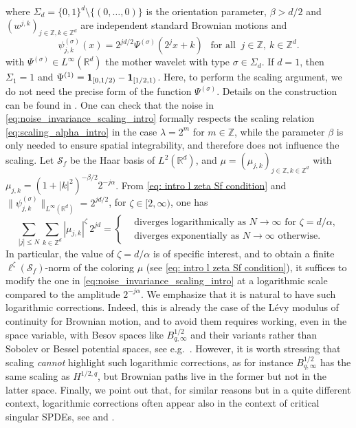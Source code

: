 \documentclass[reqno]{amsart}
\theoremstyle{plain}
\theoremstyle{remark}
\theoremstyle{plain}
\numberwithin{equation}{section}
\def\Z{{\mathbb Z}}
\def\R{{\mathbb R}}
\newcommand{\one}{{{\bf 1}}}
\newcommand{\1}{\one}
\newcommand{\Sf}{\mathcal{S}_{f}}
\begin{document}
where $\Sigma_d =\{0,1\}^d\setminus \{(0,\dots,0)\}$ is the orientation parameter, $\beta>d/2$ and $(w^{j,k})_{j\in\Z,k\in\Z^d}$ are  independent standard Brownian motions and 
$$
\psi^{(\sigma)}_{j,k}(x)= 2^{jd/2} \Psi^{(\sigma)}(2^{j} x +k)\ \ \text{ for all }\ j\in \Z, \ k\in \Z^d.
$$ 
with $\Psi^{(\sigma)}\in L^\infty(\R^d)$ the mother wavelet with type $\sigma\in \Sigma_d$. 
If $d=1$, then $\Sigma_1=1$ and $\Psi^{(1)}=\1_{[0,1/2)}-\one_{[1/2,1)}$. Here, to perform the scaling argument, we do not need the precise form of the function $\Psi^{(\sigma)}$. Details on the construction can be found in  \cite[Chapters 5 and 10]{D92_wavelets}. 
%
One can check that the noise in \eqref{eq:noise_invariance_scaling_intro} formally respects the scaling relation \eqref{eq:scaling_alpha_intro} in the case $\lambda=2^{m}$ for $m\in \Z$, while the parameter $\beta$ is only needed to ensure spatial integrability, and therefore does not influence the scaling.
%
Let $\Sf$ be the Haar basis of $L^2(\R^d)$, and $\mu=(\mu_{j,k})_{j\in \Z,k\in \Z^d}$ with $\mu_{j,k}=(1+|k|^2)^{-\beta/2} 2^{-j\alpha}$. From \eqref{eq: intro l zeta Sf condition} and $\|\psi_{j,k}^{(\sigma)}\|_{L^\infty(\R^d)}=2^{jd/2}$, for $\zeta\in [2,\infty)$, one has
$$
 \sum_{|j|\leq N}\sum_{k\in \Z^d} |\mu_{j,k}|^\zeta\, 2^{jd}
= 
\left\{
\begin{aligned}
&\text{diverges logarithmically as $N\to \infty$ for }\zeta = d/\alpha,\\
&\text{diverges exponentially as $N\to \infty$ otherwise}.
\end{aligned}
\right.
$$
In particular, the value of $\zeta=d/\alpha$ is of specific interest, and to obtain a finite $\ell^\zeta(\Sf)$-norm of the coloring $\mu$ (see \eqref{eq: intro l zeta Sf condition}), it suffices to modify the one in \eqref{eq:noise_invariance_scaling_intro} at a logarithmic scale compared to the amplitude $2^{-j\alpha}$.
%
We emphasize that it is natural to have such logarithmic corrections. Indeed, this is already the case of the L\'evy modulus of continuity for Brownian motion, and to avoid them  requires working, even in the space variable, with Besov spaces like $B^{1/2}_{q,\infty}$ and their variants rather than Sobolev or Bessel potential spaces, see e.g.\ \cite{ArOh,V11_regularity_Besov}. 
However, it is worth stressing that scaling \emph{cannot} highlight such logarithmic corrections, as for instance $B^{1/2}_{q,\infty}$ has the same scaling as $H^{1/2,q}$, but Brownian paths live in the former but not in the latter space. 
Finally, we point out that, for similar reasons but in a quite different context, logarithmic corrections often appear also in the context of critical singular SPDEs, see \cite[Subsection 1.3]{cannizzaro2024lecture} and \cite[Sections 4-6]{caravenna2025disordered}.
\end{document}
